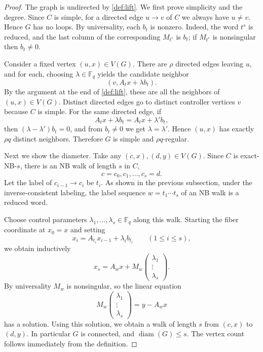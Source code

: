 \documentclass[10pt,a4paper]{amsart}
\begin{document}
\begin{proof}
The graph is undirected by \cref{def:lift}. We first
prove simplicity and the degree. Since \(C\) is simple, for a directed
edge \(u\to v\) of \(C\) we always have \(u\ne v\). Hence \(G\) has no
loops. By universality, each \(b_t\) is nonzero. Indeed, the word
\(t^s\) is reduced, and the last column of the corresponding \(M_{t^s}\)
is \(b_t\); if \(M_{t^s}\) is nonsingular then \(b_t\ne0\).

Consider a fixed vertex \((u,x)\in V(G)\). There are \(\rho\) directed
edges leaving \(u\), and for each, choosing \(\lambda\in\mathbb F_q\)
yields the candidate neighbor \[
  (v,A_tx+\lambda b_t) .
\] By the argument at the end of \cref{def:lift}, these are all the
neighbors of \((u,x)\in V(G)\). Distinct directed edges go to distinct
controller vertices \(v\) because \(C\) is simple. For the same directed
edge, if \[
  A_tx+\lambda b_t=A_tx+\lambda' b_t ,
\] then \((\lambda-\lambda')b_t=0\), and from \(b_t\ne0\) we get
\(\lambda=\lambda'\). Hence \((u,x)\) has exactly \(\rho q\) distinct
neighbors. Therefore \(G\) is simple and \(\rho q\)-regular.

Next we show the diameter. Take any \((c,x),(d,y)\in V(G)\). Since \(C\)
is exact-NB-\(s\), there is an NB walk of length \(s\) in \(C\), \[
  c=c_0,c_1,\ldots,c_s=d .
\] Let the label of \(c_{i-1}\to c_i\) be \(t_i\). As shown in the
previous subsection, under the inverse-consistent labeling, the label
sequence \(w=t_1\cdots t_s\) of an NB walk is a reduced word.

Choose control parameters \(\lambda_1,\ldots,\lambda_s\in\mathbb F_q\)
along this walk. Starting the fiber coordinate at \(x_0=x\) and setting
\[
  x_i=A_{t_i}x_{i-1}+\lambda_i b_{t_i}
  \qquad(1\le i\le s) ,
\] we obtain inductively \[
  x_s=A_wx+M_w
  \begin{pmatrix}\lambda_1\\ \vdots\\ \lambda_s\end{pmatrix} .
\] By universality \(M_w\) is nonsingular, so the linear equation \[
  M_w
  \begin{pmatrix}\lambda_1\\ \vdots\\ \lambda_s\end{pmatrix}
  =y-A_wx
\] has a solution. Using this solution, we obtain a walk of length \(s\)
from \((c,x)\) to \((d,y)\). In particular \(G\) is connected, and \(\operatorname{diam}(G)\le s\). The
vertex count follows immediately from the definition.
\end{proof}
\end{document}

